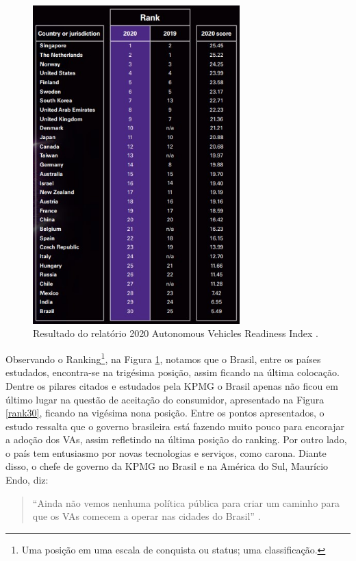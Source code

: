 \begin{figure}[H]
\centering
\includegraphics[width=8cm]{Figures/rank.jpg}
\caption{Resultado do relatório 2020 Autonomous Vehicles Readiness Index \cite{KPMG}.}
\label{KPMG}
\end{figure}

Observando o Ranking\footnote{Uma posição em uma escala de conquista ou status; uma classificação.}, na Figura \ref{KPMG}, notamos que o Brasil, entre os países estudados, encontra-se na trigésima posição, assim ficando na última colocação. Dentre os pilares citados e estudados pela KPMG o Brasil apenas não ficou em último lugar na questão de aceitação do consumidor, apresentado na Figura \ref{rank30}, ficando na vigésima nona posição.
Entre os pontos apresentados, o estudo ressalta que o governo brasileira está fazendo muito pouco para encorajar a adoção dos VAs, assim refletindo na última posição do ranking. Por outro lado, o país tem entusiasmo por novas tecnologias e serviços, como carona. Diante disso, o chefe de governo da KPMG no Brasil e na América do Sul, Maurício Endo, diz:
\begin{quote}
    
“Ainda não vemos nenhuma política pública para criar um caminho para que os VAs comecem a operar nas cidades do Brasil” \cite{KPMG}.
\end{quote}

